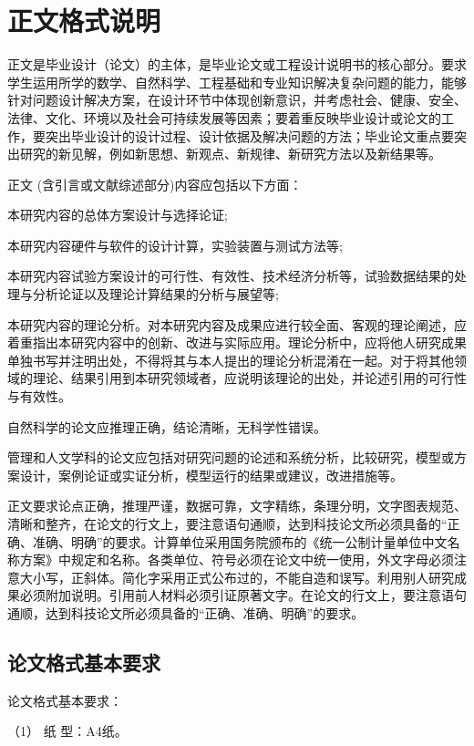 
\chapter{正文格式说明}
\label{chap01}
正文是毕业设计（论文）的主体，是毕业论文或工程设计说明书的核心部分。要求学生运用所学的数学、自然科学、工程基础和专业知识解决复杂问题的能力，能够针对问题设计解决方案，在设计环节中体现创新意识，并考虑社会、健康、安全、法律、文化、环境以及社会可持续发展等因素；要着重反映毕业设计或论文的工作，要突出毕业设计的设计过程、设计依据及解决问题的方法；毕业论文重点要突出研究的新见解，例如新思想、新观点、新规律、新研究方法以及新结果等。

正文 (含引言或文献综述部分)内容应包括以下方面：

本研究内容的总体方案设计与选择论证;

本研究内容硬件与软件的设计计算，实验装置与测试方法等;

本研究内容试验方案设计的可行性、有效性、技术经济分析等，试验数据结果的处理与分析论证以及理论计算结果的分析与展望等;

本研究内容的理论分析。对本研究内容及成果应进行较全面、客观的理论阐述，应着重指出本研究内容中的创新、改进与实际应用。理论分析中，应将他人研究成果单独书写并注明出处，不得将其与本人提出的理论分析混淆在一起。对于将其他领域的理论、结果引用到本研究领域者，应说明该理论的出处，并论述引用的可行性与有效性。

自然科学的论文应推理正确，结论清晰，无科学性错误。

管理和人文学科的论文应包括对研究问题的论述和系统分析，比较研究，模型或方案设计，案例论证或实证分析，模型运行的结果或建议，改进措施等。

正文要求论点正确，推理严谨，数据可靠，文字精练，条理分明，文字图表规范、清晰和整齐，在论文的行文上，要注意语句通顺，达到科技论文所必须具备的“正确、准确、明确”的要求。计算单位采用国务院颁布的《统一公制计量单位中文名称方案》中规定和名称。各类单位、符号必须在论文中统一使用，外文字母必须注意大小写，正斜体。简化字采用正式公布过的，不能自造和误写。利用别人研究成果必须附加说明。引用前人材料必须引证原著文字。在论文的行文上，要注意语句通顺，达到科技论文所必须具备的“正确、准确、明确”的要求。

\section{论文格式基本要求}
论文格式基本要求：

（1） 纸  型：A4纸。

